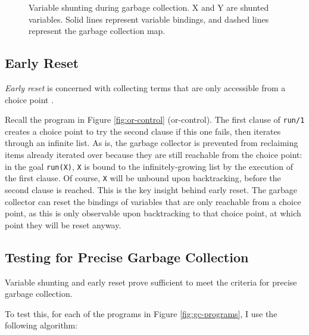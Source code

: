 \begin{enumerate}
\begin{figure}[H]
\caption{Variable shunting during garbage collection. X and Y are shunted variables. Solid lines represent variable bindings, and dashed lines represent the garbage collection map.}
\label{fig:shunt-cases}
\end{figure}

\end{enumerate}

\subsection{Early Reset}

\emph{Early reset} is concerned with collecting terms that are only accessible from a choice point \cite{applebyGarbargecollectionProlog1988}.

Recall the program in Figure \ref{fig:or-control} (or-control). The first clause of \texttt{run/1} creates a choice point to try the second clause if this one fails, then iterates through an infinite list. As is, the garbage collector is prevented from reclaiming items already iterated over because they are still reachable from the choice point: in the goal \texttt{run(X)}, \texttt{X} is bound to the infinitely-growing list by the execution of the first clause. Of course, \texttt{X} will be unbound upon backtracking, before the second clause is reached. This is the key insight behind early reset. The garbage collector can reset the bindings of variables that are only reachable from a choice point, as this is only observable upon backtracking to that choice point, at which point they will be reset anyway.

\subsection{Testing for Precise Garbage Collection}

Variable shunting and early reset prove sufficient to meet the criteria for precise garbage collection.

To test this, for each of the programs in Figure \ref{fig:gc-programs}, I use the following algorithm:

